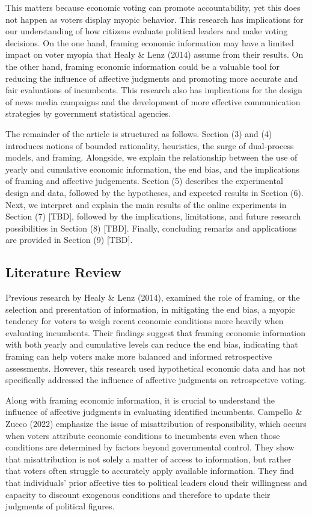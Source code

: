 \documentclass[
]{article}
\begin{document}
This matters because economic voting can promote accountability, yet
this does not happen as voters display myopic behavior. This research
has implications for our understanding of how citizens evaluate
political leaders and make voting decisions. On the one hand, framing
economic information may have a limited impact on voter myopia that
Healy \& Lenz (2014) assume from their results. On the other hand,
framing economic information could be a valuable tool for reducing the
influence of affective judgments and promoting more accurate and fair
evaluations of incumbents. This research also has implications for the
design of news media campaigns and the development of more effective
communication strategies by government statistical agencies.

The remainder of the article is structured as follows. Section (3) and
(4) introduces notions of bounded rationality, heuristics, the surge of
dual-process models, and framing. Alongside, we explain the relationship
between the use of yearly and cumulative economic information, the end
bias, and the implications of framing and affective judgements. Section
(5) describes the experimental design and data, followed by the
hypotheses, and expected results in Section (6). Next, we interpret and
explain the main results of the online experiments in Section (7)
{[}TBD{]}, followed by the implications, limitations, and future
research possibilities in Section (8) {[}TBD{]}. Finally, concluding
remarks and applications are provided in Section (9) {[}TBD{]}.

\hypertarget{literature-review}{%
\subsection{Literature Review}\label{literature-review}}

Previous research by Healy \& Lenz (2014), examined the role of framing,
or the selection and presentation of information, in mitigating the end
bias, a myopic tendency for voters to weigh recent economic conditions
more heavily when evaluating incumbents. Their findings suggest that
framing economic information with both yearly and cumulative levels can
reduce the end bias, indicating that framing can help voters make more
balanced and informed retrospective assessments. However, this research
used hypothetical economic data and has not specifically addressed the
influence of affective judgments on retrospective voting.

Along with framing economic information, it is crucial to understand the
influence of affective judgments in evaluating identified incumbents.
Campello \& Zucco (2022) emphasize the issue of misattribution of
responsibility, which occurs when voters attribute economic conditions
to incumbents even when those conditions are determined by factors
beyond governmental control. They show that misattribution is not solely
a matter of access to information, but rather that voters often struggle
to accurately apply available information. They find that individuals'
prior affective ties to political leaders cloud their willingness and
capacity to discount exogenous conditions and therefore to update their
judgments of political figures.
\end{document}
